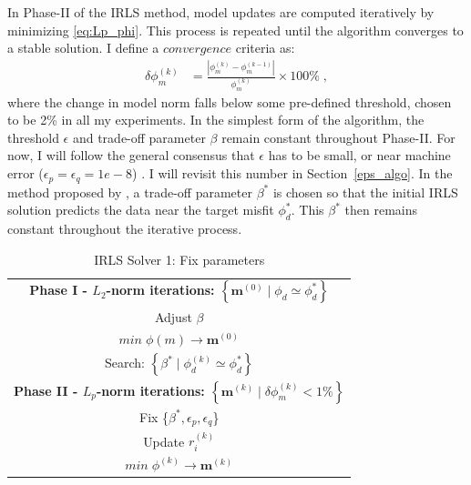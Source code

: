 In Phase-II of the IRLS method, model updates are computed iteratively by minimizing \ref{eq:Lp_phi}.
This process is repeated until the algorithm converges to a stable solution.
I define a $convergence$ criteria as:
\begin{equation}\label{Convergence}
\begin{split}
\delta \phi_m^{(k)} & = \frac{|\phi_m^{(k)} - \phi_m^{(k-1)}|}{\phi_m^{(k)}} \times 100\% \;,
\end{split} 
\end{equation} 
where the change in model norm falls below some pre-defined threshold, chosen to be 2\% in all my experiments.
In the simplest form of the algorithm, the threshold $\epsilon$ and trade-off parameter $\beta$ remain constant throughout Phase-II.
For now, I will follow the general consensus that $\epsilon$ has to be small, or near machine error ($\epsilon_p = \epsilon_q = 1e-8$) \cite[]{LastKubik83,Ajo-Franklin07, Stocco09}.
I will revisit this number in Section~\ref{eps_algo}.
In the method proposed by \cite[]{Ajo-Franklin07}, a trade-off parameter $\beta^*$ is chosen so that the initial IRLS solution predicts the data near the target misfit $\phi_d^*$. 
This $\beta^*$ then remains constant throughout the iterative process.

\begin{table}[h!]
\centering
\caption{IRLS Solver 1: Fix parameters}
\label{tbl:IRLS_v1}
\renewcommand{\arraystretch}{1.5}
\begin{tabular}{|c|}\hline
\textbf{Phase I - $L_2$-norm iterations:  $\left\{ \mathbf{m}^{(0)} \mid \phi_d \simeq \phi_d^* \right \}$}\\
Adjust $\beta$ \\
$min\; \phi(m)  \rightarrow \mathbf{m}^{(0)}$ \\ \hline
Search:   $\left\{  \beta^* \mid \phi_d^{(k)} \simeq \phi_d^* \right \}$\\ \hline
\textbf{Phase II - $L_p$-norm iterations: $\left\{  \mathbf{m}^{(k)} \mid \delta \phi_m^{(k)} < 1\%  \right \}$ }\\
Fix \{$\beta^*, \epsilon_p,\epsilon_q$\}\\
Update $r_i^{(k)}$\\
$min\; \phi^{(k)}  \rightarrow \mathbf{m}^{(k)}$\\ \hline
\end{tabular}
\end{table}

